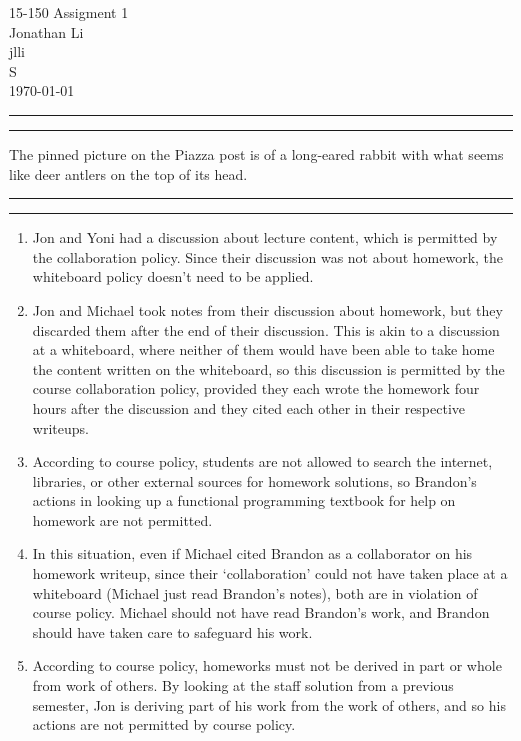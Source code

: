 \documentclass[11pt]{article}
\newcounter{questionCounter}
\newcounter{partCounter}[questionCounter]
\newenvironment{question}[2][\arabic{questionCounter}]{%
    \setcounter{partCounter}{0}%
    \vspace{.25in} \hrule \vspace{0.5em}%
        \noindent{\bf #2}%
    \vspace{0.8em} \hrule \vspace{.10in}%
    \addtocounter{questionCounter}{1}%
}{}
\newcommand{\myclass}{15-150}
\newcommand{\myname}{Jonathan Li}
\newcommand{\myandrew}{jlli}
\newcommand{\myhwname}{Assigment 1}
\newcommand{\myrecitation}{S}
\begin{document}
\thispagestyle{plain}

\begin{center}
{\Large \myclass{} \myhwname} \\
\myname \\
\myandrew \\
\myrecitation \\
\today
\end{center}


\begin{question}{Task 2.1} %
  The pinned picture on the Piazza post is of a long-eared rabbit with
  what seems like deer antlers on the top of its head.
\end{question}

\begin{question}{Task 2.2}
\begin{enumerate}[1.]
\item Jon and Yoni had a discussion about lecture content, which is
    permitted by the collaboration policy. Since their discussion was
    not about homework, the whiteboard policy doesn't need to be
    applied.
\item Jon and Michael took notes from their discussion about
    homework, but they discarded them after the end of their
    discussion. This is akin to a discussion at a whiteboard, where
    neither of them would have been able to take home the content
    written on the whiteboard, so this discussion is permitted by the
    course collaboration policy, provided they each wrote the homework
    four hours after the discussion and they cited each other in their
    respective writeups.
\item According to course policy, students are not allowed to search
    the internet, libraries, or other external sources for homework
    solutions, so Brandon's actions in looking up a functional
    programming textbook for help on homework are not permitted.
\item In this situation, even if Michael cited Brandon as a
    collaborator on his homework writeup, since their `collaboration'
    could not have taken place at a whiteboard (Michael just read
    Brandon's notes), both are in violation of course policy. Michael
    should not have read Brandon's work, and Brandon should have taken
    care to safeguard his work.
\item According to course policy, homeworks must not be derived in
    part or whole from work of others. By looking at the staff
    solution from a previous semester, Jon is deriving part of his
    work from the work of others, and so his actions are not permitted
    by course policy.
\end{enumerate}
\end{question}
\end{document}
